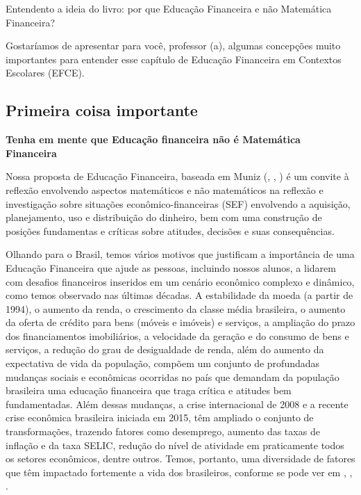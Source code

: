 \begin{apresentacao}{Entendento a ideia do livro: por que Educação Financeira e não Matemática Financeira?}

Gostaríamos de apresentar para você, professor (a), algumas concepções muito importantes para entender esse capítulo de Educação Financeira em Contextos Escolares (EFCE). 

\subsection{Primeira coisa importante}
\begin{center}
\textbf{Tenha em mente que Educação financeira não é Matemática Financeira}
\end{center}
Nossa proposta de Educação Financeira, baseada em Muniz (\citeyear{muniz2016a}, \citeyear{muniz2016b}, \citeyear{muniz2016c}) é um convite à reflexão envolvendo aspectos matemáticos e não matemáticos na reflexão e investigação sobre situações econômico-financeiras (SEF) envolvendo a aquisição, planejamento, uso e distribuição do dinheiro, bem com uma construção de posições fundamentas e críticas sobre atitudes, decisões e suas consequências. 

Olhando para o Brasil, temos vários motivos que justificam a importância de uma Educação Financeira que ajude as pessoas, incluindo nossos alunos, a lidarem com desafios financeiros inseridos em um cenário econômico complexo e dinâmico, como temos observado nas últimas décadas. A estabilidade da moeda (a partir de 1994), o aumento da renda, o crescimento da classe média brasileira, o aumento da oferta de crédito para bens (móveis e imóveis) e serviços, a ampliação do prazo dos financiamentos imobiliários, a velocidade da geração e do consumo de bens e serviços, a redução do grau de desigualdade de renda, além do aumento da expectativa de vida da população, compõem um conjunto de profundadas mudanças sociais e econômicas ocorridas no país que demandam da população brasileira uma educação financeira que traga crítica e atitudes bem fundamentadas. Além dessas mudanças, a crise internacional de 2008 e a recente crise econômica brasileira iniciada em 2015, têm ampliado o conjunto de transformações, trazendo fatores como desemprego, aumento das taxas de inflação e da taxa SELIC, redução do nível de atividade em praticamente todos os setores econômicos, dentre outros. Temos, portanto, uma diversidade de fatores que têm impactado fortemente a vida dos brasileiros, conforme se pode ver em \cite{neri2010}, \cite{PNAD2010}, \cite{leitao2011}.


\end{apresentacao}
